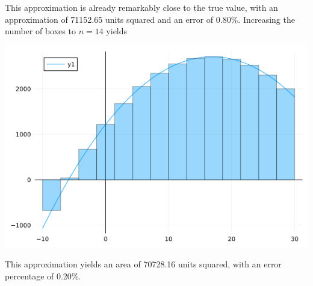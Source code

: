 \documentclass[12pt]{article}
\begin{document}
    This approximation is already remarkably close to the true value, with an approximation of 71152.65 units squared and an error of 
    0.80\%. Increasing the number of boxes to $n=14$ yields 
    \begin{center}
        \includegraphics*[scale=0.45]{images/MRAM_2.png}
    \end{center}
    This approximation yields an area of 70728.16 units squared, with an error percentage of 0.20\%.
\end{document}
